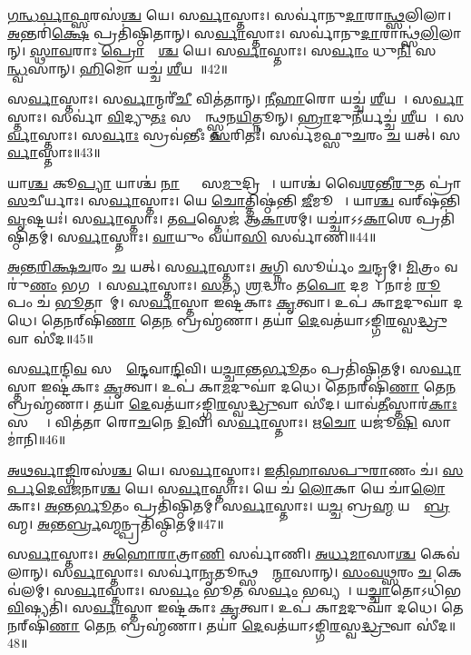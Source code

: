    \ul{𑌗}\ul{𑌨𑍍𑌧}\ul{𑌰𑍍𑌵𑌾}\ul{𑌫𑍍𑌸}𑌰𑌸॑\ul{𑌶𑍍𑌚} 𑌯𑍇।
   𑌸\ul{𑌰𑍍𑌵𑌾}𑌸𑍍𑌤𑌾𑌃।
   𑌸𑌰𑍍𑌵𑌾॑𑌨𑍁\ul{𑌦𑌾}𑌰𑌾\ul{𑌨𑍍𑌥𑍍𑌸}𑌲𑌿𑌲𑌾\sn{}।
   \ul{𑌅}𑌨𑍍𑌤𑌰𑌿॑\ul{𑌕𑍍𑌷𑍇} 𑌪𑍍𑌰𑌤𑌿॑𑌷𑍍𑌠𑌿𑌤𑌾𑌨𑍍।
   𑌸\ul{𑌰𑍍𑌵𑌾}𑌸𑍍𑌤𑌾𑌃।
   𑌸𑌰𑍍𑌵𑌾॑𑌨𑍁\ul{𑌦𑌾}𑌰𑌾𑌨𑍍𑌥𑍍𑌸॑\ul{𑌲𑌿}𑌲𑌾𑌨𑍍।
   \ul{𑌸𑍍𑌥𑌾}\ul{𑌵}𑌰𑌾𑌃 \ul{𑌪𑍍𑌰𑍋}𑌷𑍍𑌯𑌾᳚\ul{𑌶𑍍𑌚} 𑌯𑍇।
   𑌸\ul{𑌰𑍍𑌵𑌾}𑌸𑍍𑌤𑌾𑌃।
   𑌸\ul{𑌰𑍍𑌵𑌾𑌂} 𑌧𑍁\ul{𑌨𑌿}\ul{} 𑌸𑌰𑍍𑌵𑌾᳚\ul{𑌨𑍍𑌧𑍍𑌵}\ul{}𑌸𑌾𑌨𑍍।
   \ul{𑌹𑌿}𑌮𑍋 𑌯𑌚𑍍𑌚॑ \ul{𑌶𑍀}𑌯𑌤𑍇᳚॥42॥

   𑌸\ul{𑌰𑍍𑌵𑌾}𑌸𑍍𑌤𑌾𑌃।
   𑌸\ul{𑌰𑍍𑌵𑌾}𑌨𑍍𑌮𑌰𑍀॑\ul{𑌚𑍀}\an{} 𑌵𑌿𑌤॑𑌤𑌾𑌨𑍍।
   \ul{𑌨𑍀}\ul{𑌹𑌾}𑌰𑍋 𑌯𑌚𑍍𑌚॑ \ul{𑌶𑍀}𑌯𑌤𑍇᳚।
   𑌸\ul{𑌰𑍍𑌵𑌾}𑌸𑍍𑌤𑌾𑌃।
   𑌸𑌰𑍍𑌵𑌾॑ \ul{𑌵𑌿}𑌦𑍍𑌯𑍁\ul{𑌤𑌃} 𑌸𑌰𑍍𑌵𑌾᳚𑌨𑍍𑌥𑍍𑌸𑍍𑌤𑌨\ul{𑌯𑌿}𑌤𑍍𑌨𑍂𑌨𑍍।
   \ul{𑌹𑍍𑌰𑌾}𑌦𑍁\ul{𑌨𑍀}𑌰𑍍𑌯𑌚𑍍𑌚॑ \ul{𑌶𑍀}𑌯𑌤𑍇᳚।
   𑌸\ul{𑌰𑍍𑌵𑌾}𑌸𑍍𑌤𑌾𑌃।
   𑌸\ul{𑌰𑍍𑌵𑌾𑌃} 𑌸𑍍𑌰𑌵॑𑌨𑍍𑌤𑍀𑌃 \ul{𑌸}𑌰𑌿𑌤𑌃॑।
   𑌸𑌰𑍍𑌵॑𑌮𑌫𑍍𑌸𑍁\ul{𑌚}𑌰𑌂 \ul{𑌚} 𑌯𑌤𑍍।
   𑌸\ul{𑌰𑍍𑌵𑌾}𑌸𑍍𑌤𑌾𑌃॥43॥

   𑌯𑌾\ul{𑌶𑍍𑌚} 𑌕𑍂\ul{𑌪𑍍𑌯𑌾} 𑌯𑌾𑌶𑍍𑌚॑ \ul{𑌨𑌾}𑌦𑍍𑌯𑌾𑌃᳚ 𑌸\ul{𑌮𑍁}𑌦𑍍𑌰𑌿𑌯𑌾𑌃᳚।
   𑌯𑌾𑌶𑍍𑌚॑ 𑌵𑍈\ul{𑌶}𑌨𑍍𑌤𑍀\ul{𑌰𑍁}𑌤 𑌪𑍍𑌰𑌾॑\ul{𑌸}𑌚𑍀𑌰𑍍𑌯𑌾𑌃।
   𑌸\ul{𑌰𑍍𑌵𑌾}𑌸𑍍𑌤𑌾𑌃।
   𑌯𑍇 \ul{𑌚𑍋}𑌤𑍍𑌤𑌿𑌷𑍍𑌠॑𑌨𑍍𑌤𑌿 \ul{𑌜𑍀}𑌮𑍂𑌤𑌾𑌃᳚।
   𑌯𑌾\ul{𑌶𑍍𑌚} 𑌵𑌰𑍍‌𑌷॑𑌨𑍍𑌤𑌿 \ul{𑌵𑍃}𑌷𑍍𑌟𑌯𑌃॑।
   𑌸\ul{𑌰𑍍𑌵𑌾}𑌸𑍍𑌤𑌾𑌃।
   𑌤\ul{𑌪}𑌸𑍍𑌤𑍇𑌜॑ 𑌆\ul{𑌕𑌾}𑌶𑌮𑍍।
   𑌯𑌚𑍍𑌚𑌾॑𑌽𑌽\ul{𑌕𑌾}𑌶𑍇 𑌪𑍍𑌰𑌤𑌿॑𑌷𑍍𑌠𑌿𑌤𑌮𑍍।
   𑌸\ul{𑌰𑍍𑌵𑌾}𑌸𑍍𑌤𑌾𑌃।
   \ul{𑌵𑌾}𑌯𑍁𑌂 𑌵𑌯𑌾॑\ul{𑌸𑌿} 𑌸𑌰𑍍𑌵𑌾॑𑌣𑌿॥44॥

   \ul{𑌅}\ul{𑌨𑍍𑌤}\ul{𑌰𑌿}\ul{𑌕𑍍𑌷}\ul{𑌚}𑌰𑌂 \ul{𑌚} 𑌯𑌤𑍍।
   𑌸\ul{𑌰𑍍𑌵𑌾}𑌸𑍍𑌤𑌾𑌃।
   \ul{𑌅}𑌗𑍍𑌨𑌿 𑌸𑍂𑌰𑍍𑌯𑌂॑ \ul{𑌚}𑌨𑍍𑌦𑍍𑌰𑌮𑍍।
   \ul{𑌮𑌿}𑌤𑍍𑌰𑌂 𑌵𑌰𑍁॑\ul{𑌣𑌂} 𑌭𑌗𑌮𑍍᳚।
   𑌸\ul{𑌰𑍍𑌵𑌾}𑌸𑍍𑌤𑌾𑌃।
   \ul{𑌸}𑌤𑍍𑌯 \ul{𑌶𑍍𑌰}𑌦𑍍𑌧𑌾𑌂 𑌤\ul{𑌪𑍋} 𑌦𑌮𑌮𑍍᳚।
   𑌨𑌾𑌮॑ \ul{𑌰𑍂}𑌪𑌂 𑌚॑ \ul{𑌭𑍂}𑌤𑌾𑌨𑌾᳚𑌮𑍍।
   𑌸\ul{𑌰𑍍𑌵𑌾}𑌸𑍍𑌤𑌾 𑌇𑌷𑍍𑌟॑𑌕𑌾𑌃 \ul{𑌕𑍃}𑌤𑍍𑌵𑌾।
   𑌉𑌪॑ 𑌕𑌾\ul{𑌮}𑌦𑍁𑌘𑌾॑ 𑌦𑌧𑍇।
   𑌤𑍇𑌨𑌰𑍍‌𑌷𑌿॑\ul{𑌣𑌾} 𑌤𑍇\ul{𑌨} 𑌬𑍍𑌰𑌹𑍍𑌮॑𑌣𑌾।
   𑌤𑌯𑌾॑ \ul{𑌦𑍇}𑌵𑌤॑𑌯𑌾𑌽𑌙𑍍𑌗𑌿\ul{𑌰}𑌸𑍍𑌵\ul{𑌦𑍍𑌧𑍍𑌰𑍁}𑌵𑌾 𑌸𑍀॑𑌦॥45॥
\anuvakamend
  
   𑌸\ul{𑌰𑍍𑌵𑌾}𑌨𑍍𑌦𑌿\ul{𑌵}\ul{} 𑌸𑌰𑍍𑌵𑌾᳚\ul{𑌨𑍍𑌦𑍇}𑌵𑌾\ul{𑌨𑍍𑌦𑌿}𑌵𑌿।
   𑌯\ul{𑌚𑍍𑌚𑌾}𑌨𑍍𑌤\ul{𑌰𑍍𑌭𑍂}𑌤𑌂 𑌪𑍍𑌰𑌤𑌿॑𑌷𑍍𑌠𑌿𑌤𑌮𑍍।
   𑌸\ul{𑌰𑍍𑌵𑌾}𑌸𑍍𑌤𑌾 𑌇𑌷𑍍𑌟॑𑌕𑌾𑌃 \ul{𑌕𑍃}𑌤𑍍𑌵𑌾।
   𑌉𑌪॑ 𑌕𑌾\ul{𑌮}𑌦𑍁𑌘𑌾॑ 𑌦𑌧𑍇।
   𑌤𑍇𑌨𑌰𑍍‌𑌷𑌿॑\ul{𑌣𑌾} 𑌤𑍇\ul{𑌨} 𑌬𑍍𑌰𑌹𑍍𑌮॑𑌣𑌾।
   𑌤𑌯𑌾॑ \ul{𑌦𑍇}𑌵𑌤॑𑌯𑌾𑌽𑌙𑍍𑌗𑌿\ul{𑌰}𑌸𑍍𑌵\ul{𑌦𑍍𑌧𑍍𑌰𑍁}𑌵𑌾 𑌸𑍀॑𑌦।
   𑌯𑌾𑌵॑\ul{𑌤𑍀}𑌸𑍍𑌤𑌾𑌰॑\ul{𑌕𑌾𑌃} 𑌸𑌰𑍍𑌵𑌾𑌃᳚।
   𑌵𑌿𑌤॑𑌤𑌾 𑌰𑍋\ul{𑌚}𑌨𑍇 \ul{𑌦𑌿}𑌵𑌿।
   𑌸\ul{𑌰𑍍𑌵𑌾}𑌸𑍍𑌤𑌾𑌃।
   𑌋\ul{𑌚𑍋} 𑌯𑌜𑍂॑\ul{𑌷𑌿} 𑌸𑌾𑌮𑌾॑𑌨𑌿॥46॥

   \ul{𑌅}\ul{𑌥}\ul{𑌰𑍍𑌵𑌾}\ul{𑌙𑍍𑌗𑌿}𑌰𑌸॑\ul{𑌶𑍍𑌚} 𑌯𑍇।
   𑌸\ul{𑌰𑍍𑌵𑌾}𑌸𑍍𑌤𑌾𑌃।
   \ul{𑌇}\ul{𑌤𑌿}\ul{𑌹𑌾}\ul{𑌸}\ul{𑌪𑍁}\ul{𑌰𑌾}𑌣𑌂 𑌚॑।
   \ul{𑌸}\ul{𑌰𑍍𑌪}\ul{𑌦𑍇}\ul{𑌵}\ul{𑌜}𑌨𑌾\ul{𑌶𑍍𑌚} 𑌯𑍇।
   𑌸\ul{𑌰𑍍𑌵𑌾}𑌸𑍍𑌤𑌾𑌃।
   𑌯𑍇 𑌚॑ \ul{𑌲𑍋}𑌕𑌾 𑌯𑍇 𑌚𑌾॑\ul{𑌲𑍋}𑌕𑌾𑌃।
   \ul{𑌅}𑌨𑍍𑌤\ul{𑌰𑍍𑌭𑍂}𑌤𑌂 𑌪𑍍𑌰𑌤𑌿॑𑌷𑍍𑌠𑌿𑌤𑌮𑍍।
   𑌸\ul{𑌰𑍍𑌵𑌾}𑌸𑍍𑌤𑌾𑌃।
   𑌯\ul{𑌚𑍍𑌚} 𑌬𑍍𑌰\ul{𑌹𑍍𑌮} 𑌯𑌚𑍍𑌚𑌾᳚\ul{𑌬𑍍𑌰}𑌹𑍍𑌮।
   \ul{𑌅}𑌨𑍍𑌤\ul{𑌰𑍍𑌬𑍍𑌰}𑌹𑍍𑌮𑌨𑍍𑌪𑍍𑌰𑌤𑌿॑𑌷𑍍𑌠𑌿𑌤𑌮𑍍॥47॥

   𑌸\ul{𑌰𑍍𑌵𑌾}𑌸𑍍𑌤𑌾𑌃।
   \ul{𑌅}\ul{𑌹𑍋}\ul{𑌰𑌾}𑌤𑍍𑌰𑌾\ul{𑌣𑌿} 𑌸𑌰𑍍𑌵𑌾॑𑌣𑌿।
   \ul{𑌅}\ul{𑌰𑍍𑌧}\ul{𑌮𑌾}𑌸𑌾\ul{𑌶𑍍𑌚} 𑌕𑍇𑌵॑𑌲𑌾𑌨𑍍।
   𑌸\ul{𑌰𑍍𑌵𑌾}𑌸𑍍𑌤𑌾𑌃।
   𑌸𑌰𑍍𑌵𑌾॑\ul{𑌨𑍃}𑌤𑍂𑌨𑍍𑌥𑍍𑌸𑌰𑍍𑌵𑌾᳚\ul{𑌨𑍍𑌮𑌾}𑌸𑌾𑌨𑍍।
   \ul{𑌸𑌂}\ul{𑌵}\ul{𑌥𑍍𑌸}𑌰𑌂 \ul{𑌚} 𑌕𑍇𑌵॑𑌲𑌮𑍍।
   𑌸\ul{𑌰𑍍𑌵𑌾}𑌸𑍍𑌤𑌾𑌃।
   𑌸\ul{𑌰𑍍𑌵𑌂} 𑌭𑍂\ul{𑌤}\ul{} 𑌸\ul{𑌰𑍍𑌵𑌂} 𑌭𑌵𑍍𑌯𑌮𑍍᳚।
   𑌯\ul{𑌚𑍍𑌚𑌾}𑌤𑍋𑌽𑌧𑌿॑𑌭\ul{𑌵𑌿}𑌷𑍍𑌯𑌤𑌿॑।
   𑌸\ul{𑌰𑍍𑌵𑌾}𑌸𑍍𑌤𑌾 𑌇𑌷𑍍𑌟॑𑌕𑌾𑌃 \ul{𑌕𑍃}𑌤𑍍𑌵𑌾।
   𑌉𑌪॑ 𑌕𑌾\ul{𑌮}𑌦𑍁𑌘𑌾॑ 𑌦𑌧𑍇।
   𑌤𑍇𑌨𑌰𑍍‌𑌷𑌿॑\ul{𑌣𑌾} 𑌤𑍇\ul{𑌨} 𑌬𑍍𑌰𑌹𑍍𑌮॑𑌣𑌾।
   𑌤𑌯𑌾॑ \ul{𑌦𑍇}𑌵𑌤॑𑌯𑌾𑌽𑌙𑍍𑌗𑌿\ul{𑌰}𑌸𑍍𑌵\ul{𑌦𑍍𑌧𑍍𑌰𑍁}𑌵𑌾 𑌸𑍀॑𑌦॥48॥
\anuvakamend
  
